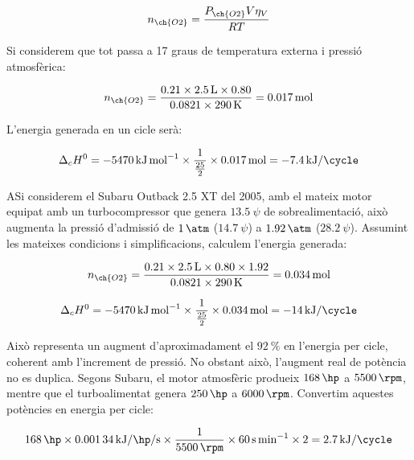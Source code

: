 \begin{equation}
    n_{\ch{O2}} = \frac{P_{\ch{O2}} V\eta_V}{RT} 
\end{equation}

Si considerem que tot passa a 17 graus de temperatura externa i pressió atmosfèrica:

\begin{equation}
    n_{\ch{O2}} = \frac{0.21 \times \qty{2.5}{\liter} \times 0.80}{0.0821 \times \qty{290}{\kelvin}} = \qty{0.017}{\mole}
\end{equation}

L'energia generada en un cicle serà:

\begin{equation}
    \Delta_cH^0 = \qty{-5470}{\kilo\joule\per\mole} \times \frac{1}{\frac{25}{2}} \times \qty{0.017}{\mole} = \qty{-7.4}{\kilo\joule\per\cycle}
\end{equation}

ASi considerem el Subaru Outback 2.5 XT del 2005, amb el mateix motor equipat amb un turbocompressor que genera \(\qty{13.5}{\psi}\) de sobrealimentació, això augmenta la pressió d'admissió de \(\qty{1}{\atm}\) (\(\qty{14.7}{\psi}\)) a \(\qty{1.92}{\atm}\) (\(\qty{28.2}{\psi}\)). Assumint les mateixes condicions i simplificacions, calculem l'energia generada:

\begin{equation}
    n_{\ch{O2}} = \frac{0.21 \times \qty{2.5}{\liter} \times 0.80 \times 1.92}{0.0821 \times \qty{290}{\kelvin}} = \qty{0.034}{\mole}
\end{equation}

\begin{equation}
    \Delta_cH^0 = \qty{-5470}{\kilo\joule\per\mole} \times \frac{1}{\frac{25}{2}} \times \qty{0.034}{\mole} = \qty{-14}{\kilo\joule\per\cycle}
\end{equation}

Això representa un augment d'aproximadament el \(\qty{92}{\percent}\) en l'energia per cicle, coherent amb l'increment de pressió. No obstant això, l'augment real de potència no es duplica. Segons Subaru, el motor atmosfèric produeix \(\qty{168}{\hp}\) a \(\qty{5500}{\rpm}\), mentre que el turboalimentat genera \(\qty{250}{\hp}\) a \(\qty{6000}{\rpm}\). Convertim aquestes potències en energia per cicle:

\begin{equation}
    \qty{168}{\hp} \times \qty{0.00134}{\kilo\joule\per\hp\per\second} \times \frac{1}{\qty{5500}{\rpm}} \times \qty{60}{\second\per\minute} \times 2 = \qty{2.7}{\kilo\joule\per\cycle}
\end{equation}

